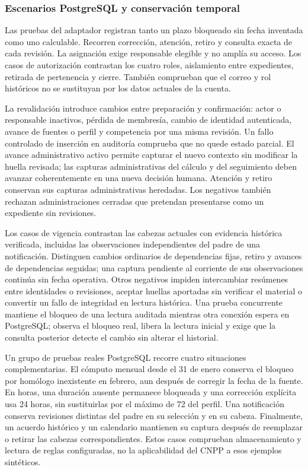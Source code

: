 \subsubsection{Escenarios PostgreSQL y conservación temporal}

Las pruebas del adaptador registran tanto un plazo bloqueado sin fecha inventada como uno calculable. Recorren corrección, atención, retiro y consulta exacta de cada revisión. La asignación exige responsable elegible y no amplía su acceso. Los casos de autorización contrastan los cuatro roles, aislamiento entre expedientes, retirada de pertenencia y cierre. También comprueban que el correo y rol históricos no se sustituyan por los datos actuales de la cuenta.

La revalidación introduce cambios entre preparación y confirmación: actor o responsable inactivos, pérdida de membresía, cambio de identidad autenticada, avance de fuentes o perfil y competencia por una misma revisión. Un fallo controlado de inserción en auditoría comprueba que no quede estado parcial. El avance administrativo activo permite capturar el nuevo contexto sin modificar la huella revisada; las capturas administrativas del cálculo y del seguimiento deben avanzar coherentemente en una nueva decisión humana. Atención y retiro conservan sus capturas administrativas heredadas. Los negativos también rechazan administraciones cerradas que pretendan presentarse como un expediente sin revisiones.

Los casos de vigencia contrastan las cabezas actuales con evidencia histórica verificada, incluidas las observaciones independientes del padre de una notificación. Distinguen cambios ordinarios de dependencias fijas, retiro y avances de dependencias seguidas; una captura pendiente al corriente de sus observaciones continúa sin fecha operativa. Otros negativos impiden intercambiar resúmenes entre identidades o revisiones, aceptar huellas aportadas sin verificar el material o convertir un fallo de integridad en lectura histórica. Una prueba concurrente mantiene el bloqueo de una lectura auditada mientras otra conexión espera en PostgreSQL; observa el bloqueo real, libera la lectura inicial y exige que la consulta posterior detecte el cambio sin alterar el historial.

Un grupo de pruebas reales PostgreSQL recorre cuatro situaciones complementarias. El cómputo mensual desde el 31 de enero conserva el bloqueo por homólogo inexistente en febrero, aun después de corregir la fecha de la fuente. En horas, una duración ausente permanece bloqueada y una corrección explícita usa 24 horas, sin sustituirlas por el máximo de 72 del perfil. Una notificación conserva revisiones distintas del padre en su selección y en su cabeza. Finalmente, un acuerdo histórico y un calendario mantienen su captura después de reemplazar o retirar las cabezas correspondientes. Estos casos comprueban almacenamiento y lectura de reglas configuradas, no la aplicabilidad del CNPP a esos ejemplos sintéticos.

